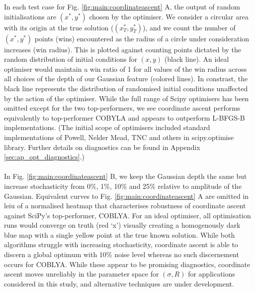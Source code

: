  \onecolumngrid
\twocolumngrid
\FloatBarrier
 In each test case for Fig. \ref{fig:main:coordinateascent} A, the output of random initialisations are $(x^*, y^*)$ chosen by the optimiser. We consider a circular area with its origin at the true solution ($(x_T^*, y_T^*)$), and we count the number of $(x^*, y^*)$  points (wins) encountered as the radius of a circle under consideration increases (win radius). This is plotted against counting points dictated by the random distribution of initial conditions for $(x,y)$ (black line). An ideal optimiser would maintain a win ratio of 1 for all values of the win radius across all  choices of the depth of our Gaussian feature (colored lines). In constrast, the black line represents the distribution of randomised initial conditions unaffected by the action of the optimiser. While the full range of Scipy optimisers has been omitted except for the two top-performers, we see coordinate ascent performs equivalently to top-performer COBYLA and appears to outperform L-BFGS-B implementations. (The initial scope of optimisers included standard implementations of Powell, Nelder Mead, TNC and others in scipy.optimise library. Further details on diagnostics can be found in Appendix \ref{sec:ap_opt_diagnostics}.) 
 \\
 \\
 In Fig. \ref{fig:main:coordinateascent} B, we keep the Gaussian depth the same but increase stochasticity from 0\%, 1\%, 10\% and 25\% relative to amplitude of the Gaussian. Equivalent curves to Fig. \ref{fig:main:coordinateascent} A are omitted in leiu of a normalised heatmap that characterises robustness of coordinate ascent against SciPy's top-performer, COBLYA. For an ideal optimiser, all optimisation runs would converge on truth (red `x') visually creating a homogenously dark blue map with a single yellow point at the true known solution. While both algorithms struggle with increasing stochasticity, coordinate ascent is able to discern a global optimum with 10\% noise level whereas no such discernement occurs for COBLYA.  While these appear to be promising diagnostics, coordinate ascent moves  unreliably in the parameter space for $(\sigma, R)$ for applications considered in this study, and alternative techniques are under development.
 \FloatBarrier

